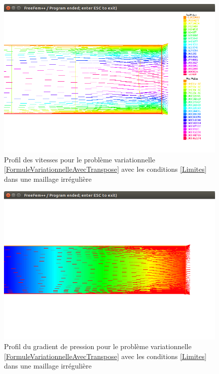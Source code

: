 \documentclass[11pt,a4paper]{article}
\numberwithin{equation}{subsection}
\numberwithin{figure}{subsection}
\begin{document}
\begin{figure}[h]
\centering
\includegraphics[scale=0.4]{StokesLimitesTransposeVitessesIrregulier.png}
\caption{Profil des vitesses pour le problème variationnelle \ref{FormuleVariationnelleAvecTranspose} avec les conditions \ref{Limites} dans une maillage irrégulière}
\label{StokesLimitesTransposeVitessesIrregulier}
\end{figure}

\begin{figure}[h]
\centering
\includegraphics[scale=0.4]{StokesLimitesTransposePressionIrregulier.png}
\caption{Profil du gradient de pression pour le problème variationnelle \ref{FormuleVariationnelleAvecTranspose} avec les conditions \ref{Limites} dans une maillage irrégulière}
\label{StokesLimitesTransposePressionIrregulier}
\end{figure}
\end{document}
